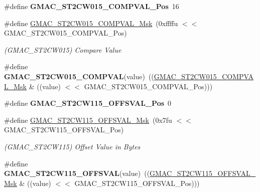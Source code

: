 \begin{DoxyCompactItemize}
\item 
\mbox{\label{group__SAMV71__GMAC_ga99edb2b8d833cd453cda522eece1e6b2}} 
\#define {\bfseries G\+M\+A\+C\+\_\+\+S\+T2\+C\+W015\+\_\+\+C\+O\+M\+P\+V\+A\+L\+\_\+\+Pos}~16
\item 
\mbox{\label{group__SAMV71__GMAC_ga979e875d564a55e8bbdcc51665201786}} 
\#define \mbox{\hyperlink{group__SAMV71__GMAC_ga979e875d564a55e8bbdcc51665201786}{G\+M\+A\+C\+\_\+\+S\+T2\+C\+W015\+\_\+\+C\+O\+M\+P\+V\+A\+L\+\_\+\+Msk}}~(0xffffu $<$$<$ G\+M\+A\+C\+\_\+\+S\+T2\+C\+W015\+\_\+\+C\+O\+M\+P\+V\+A\+L\+\_\+\+Pos)
\begin{DoxyCompactList}\small\item\em (G\+M\+A\+C\+\_\+\+S\+T2\+C\+W015) Compare Value \end{DoxyCompactList}\item 
\mbox{\label{group__SAMV71__GMAC_ga5b88618ac1e3ec534b6771360151157b}} 
\#define {\bfseries G\+M\+A\+C\+\_\+\+S\+T2\+C\+W015\+\_\+\+C\+O\+M\+P\+V\+AL}(value)~((\mbox{\hyperlink{group__SAMV71__GMAC_ga979e875d564a55e8bbdcc51665201786}{G\+M\+A\+C\+\_\+\+S\+T2\+C\+W015\+\_\+\+C\+O\+M\+P\+V\+A\+L\+\_\+\+Msk}} \& ((value) $<$$<$ G\+M\+A\+C\+\_\+\+S\+T2\+C\+W015\+\_\+\+C\+O\+M\+P\+V\+A\+L\+\_\+\+Pos)))
\item 
\mbox{\label{group__SAMV71__GMAC_ga09c5005c4fdbc41fdffe21a4d8cff012}} 
\#define {\bfseries G\+M\+A\+C\+\_\+\+S\+T2\+C\+W115\+\_\+\+O\+F\+F\+S\+V\+A\+L\+\_\+\+Pos}~0
\item 
\mbox{\label{group__SAMV71__GMAC_ga8915a6df60c8f1c436c4851c3bc1a903}} 
\#define \mbox{\hyperlink{group__SAMV71__GMAC_ga8915a6df60c8f1c436c4851c3bc1a903}{G\+M\+A\+C\+\_\+\+S\+T2\+C\+W115\+\_\+\+O\+F\+F\+S\+V\+A\+L\+\_\+\+Msk}}~(0x7fu $<$$<$ G\+M\+A\+C\+\_\+\+S\+T2\+C\+W115\+\_\+\+O\+F\+F\+S\+V\+A\+L\+\_\+\+Pos)
\begin{DoxyCompactList}\small\item\em (G\+M\+A\+C\+\_\+\+S\+T2\+C\+W115) Offset Value in Bytes \end{DoxyCompactList}\item 
\mbox{\label{group__SAMV71__GMAC_ga343adf63bcdb9618f96d9dec4e4d792f}} 
\#define {\bfseries G\+M\+A\+C\+\_\+\+S\+T2\+C\+W115\+\_\+\+O\+F\+F\+S\+V\+AL}(value)~((\mbox{\hyperlink{group__SAMV71__GMAC_ga8915a6df60c8f1c436c4851c3bc1a903}{G\+M\+A\+C\+\_\+\+S\+T2\+C\+W115\+\_\+\+O\+F\+F\+S\+V\+A\+L\+\_\+\+Msk}} \& ((value) $<$$<$ G\+M\+A\+C\+\_\+\+S\+T2\+C\+W115\+\_\+\+O\+F\+F\+S\+V\+A\+L\+\_\+\+Pos)))

\end{DoxyCompactItemize}
